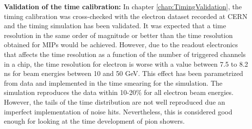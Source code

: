 \noindent\textbf{Validation of the time calibration:} In chapter \ref{chap:TimingValidation}, the timing calibration was cross-checked with the electron dataset recorded at CERN and the timing simulation has been validated. It was expected that a time resolution in the same order of magnitude or better than the time resolution obtained for MIPs would be achieved. However, due to the readout electronics that affects the time resolution as a function of the number of triggered channels in a chip, the time resolution for electron is worse with a value between 7.5 to 8.2 ns for beam energies between 10 and 50 GeV. This effect has been parametrized from data and implemented in the time smearing for the simulation. The simulation reproduces the data within 10-20\% for all electron beam energies. However, the tails of the time distribution are not well reproduced due an imperfect implementation of noise hits. Nevertheless, this is considered good enough for looking at the time development of pion showers.\\[0.1cm]

